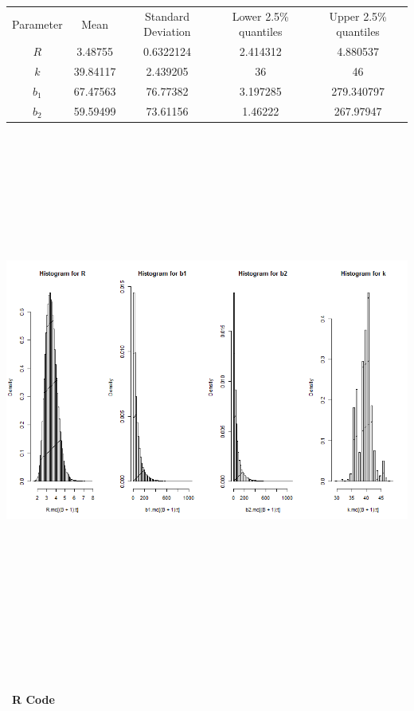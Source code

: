\documentclass[10pt,a4paper]{article}
\begin{document}
\begin{center}
  \begin{tabular}{ |c|c|c|c|c| }
  \hline
  Parameter & Mean & Standard Deviation & Lower 2.5\% quantiles & Upper 2.5\% quantiles  \\ 
  $R$ & 3.48755 & 0.6322124 & 2.414312 & 4.880537 \\
  $k$ & 39.84117 & 2.439205 & 36 & 46 \\
  $b_1$ & 67.47563 &  76.77382 &  3.197285  & 279.340797  \\
  $b_2$ &  59.59499 & 73.61156 & 1.46222 & 267.97947 \\
  \hline
  \end{tabular}
  \end{center}
\centerline{\includegraphics[width=17cm,height=17cm,keepaspectratio]{./images/hist}}
\text{}\\
\\\
\textbf{R Code} 
\end{document}
